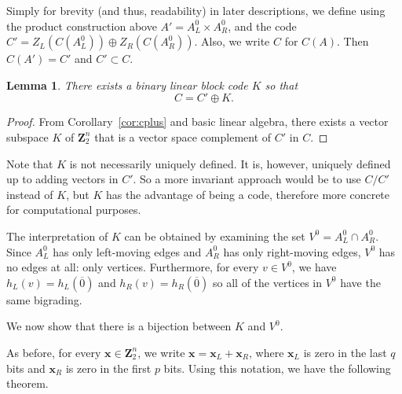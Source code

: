 \documentclass[12pt,twoside,singlespace]{article}
\numberwithin{equation}{section}
\newtheorem{lem}[equation]{Lemma}
\theoremstyle{definition}
\newcommand{\ZZ}{\mathbf{Z}}
\renewcommand{\vec}[1]{\mathbf{#1}}
\begin{document}
Simply for brevity (and thus, readability) in later descriptions, we define using the product construction above $A'=A_L^0\times A_R^0$, and the code $C'=Z_L(C(A_L^0))\oplus Z_R(C(A_R^0))$.  Also, we write $C$ for $C(A)$.  Then $C(A')=C'$ and $C'\subset C$.

\begin{lem}
\label{lem:existk}
There exists a binary linear block code $K$ so that
\[C=C' \oplus K.
\]
\end{lem}
\begin{proof}
From Corollary~\ref{cor:cplus} and basic linear algebra, there exists a vector subspace $K$ of $\ZZ_2^n$ that is a vector space complement of
$C'$ in $C$.
\end{proof}
Note that $K$ is not necessarily uniquely defined.  It is, however, uniquely defined up to adding vectors in $C'$.  So a more invariant approach would be to use $C/C'$ instead of $K$, but $K$ has the advantage of being a code, therefore more concrete for computational purposes.



The interpretation of $K$ can be obtained by examining the set $V^0=A_L^0\cap A_R^0$.  Since $A_L^0$ has only left-moving edges and $A_R^0$ has only right-moving edges, $V^0$ has no edges at all: only vertices.  Furthermore, for every $v\in V^0$, we have $h_L(v)=h_L(\overline{0})$ and $h_R(v)=h_R(\overline{0})$ so all of the vertices in $V^0$ have the same bigrading.

We now show that there is a bijection between $K$ and $V^0$.

As before, for every $\vec{x}\in\ZZ_2^n$, we write $\vec{x}=\vec{x}_L+\vec{x}_R$, where $\vec{x}_L$ is zero in the last $q$ bits and $\vec{x}_R$ is zero in the first $p$ bits.  Using this notation, we have the following theorem.
\end{document}
